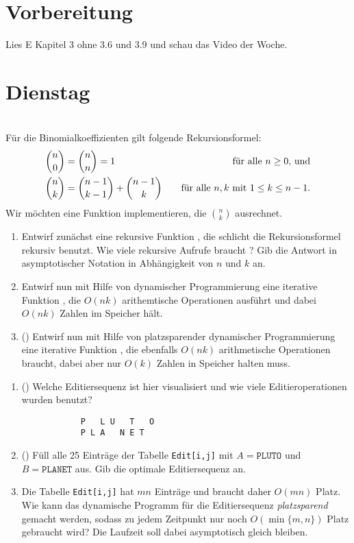 \documentclass{uebung_cs}
\begin{document}
\section*{Vorbereitung}
Lies E Kapitel 3 ohne 3.6 und 3.9 und schau das Video der Woche.

\section*{Dienstag}

\begin{aufgabe}\mbox{}\\
    Für die Binomialkoeffizienten gilt folgende Rekursionsformel:
    \begin{align*}
        \binom{n}{0}&=\binom{n}{n}=1&\quad\text{für alle $n\ge 0$, und}\\
        \binom{n}{k}&=\binom{n-1}{k-1}+\binom{n-1}{k}&\quad\text{für alle $n,k$ mit $ 1\le k \le n-1$.}
    \end{align*}
    Wir möchten eine Funktion implementieren, die $\binom{n}{k}$ ausrechnet.
    \begin{enumerate}
        \item Entwirf zunächst eine rekursive Funktion , die schlicht die Rekursionsformel rekursiv benutzt. Wie viele rekursive Aufrufe braucht ? Gib die Antwort in asymptotischer Notation in Abhängigkeit von $n$ und $k$ an.
        \item Entwirf nun mit Hilfe von dynamischer Programmierung eine iterative Funktion , die $O(nk)$ arithemtische Operationen ausführt und dabei $O(nk)$ Zahlen im Speicher hält.
        \item (\hard) Entwirf nun mit Hilfe von platzsparender dynamischer Programmierung eine iterative Funktion , die ebenfalls $O(nk)$ arithmetische Operationen braucht, dabei aber nur $O(k)$ Zahlen in Speicher halten muss.
    \end{enumerate}
\end{aufgabe}

\begin{aufgabe}[Editieren]\mbox{}
    \begin{enumerate}
        \item(\warmup) Welche Editiersequenz ist hier visualisiert und wie viele Editieroperationen wurden benutzt?
        \begin{verbatim}
            P   L U   T   O
            P L A   N E T
        \end{verbatim}
        \item(\warmup) Füll alle 25 Einträge der Tabelle \texttt{Edit[i,j]} mit $A=\texttt{PLUTO}$ und $B=\texttt{PLANET}$ aus. Gib die optimale Editiersequenz an.
        \item Die Tabelle \texttt{Edit[i,j]} hat $mn$ Einträge und braucht daher $O(mn)$ Platz. Wie kann das dynamische Programm für die Editiersequenz \emph{platzsparend} gemacht werden, sodass zu jedem Zeitpunkt nur noch ${O(\min\{m,n\})}$ Platz gebraucht wird? Die Laufzeit soll dabei asymptotisch gleich bleiben.
    \end{enumerate}
\end{aufgabe}
\end{document}
